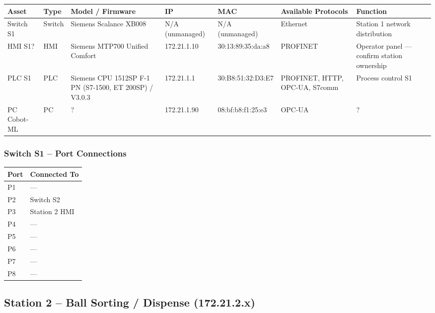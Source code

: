 \begin{adjustbox}{max width=\textwidth}
\begin{tabular}{lllllll}
\toprule
\textbf{Asset} & \textbf{Type} & \textbf{Model / Firmware} & \textbf{IP} & \textbf{MAC} & \textbf{Available Protocols} & \textbf{Function} \\
\midrule
Switch S1   & Switch & Siemens Scalance XB008 & N/A (unmanaged) & N/A (unmanaged)   & Ethernet & Station 1 network distribution \\
HMI S1?     & HMI    & Siemens MTP700 Unified Comfort & 172.21.1.10 & 30:13:89:35:da:a8 & PROFINET & Operator panel --- confirm station ownership \\
PLC S1      & PLC    & Siemens CPU 1512SP F-1 PN (S7-1500, ET 200SP) / V3.0.3 & 172.21.1.1 & 30:B8:51:32:D3:E7 & PROFINET, HTTP, OPC-UA, S7comm & Process control S1 \\
PC Cobot-ML & PC     & ? & 172.21.1.90 & 08:bf:b8:f1:25:e3 & OPC-UA & ? \\
\bottomrule
\end{tabular}
\end{adjustbox}

\subsubsection{Switch S1 – Port Connections}

\begin{tabular}{ll}
\toprule
\textbf{Port} & \textbf{Connected To} \\
\midrule
P1 & — \\
P2 & Switch S2 \\
P3 & Station 2 HMI \\
P4 & — \\
P5 & — \\
P6 & — \\
P7 & — \\
P8 & — \\
\bottomrule
\end{tabular}

\subsection{Station 2 – Ball Sorting / Dispense (172.21.2.x)}

